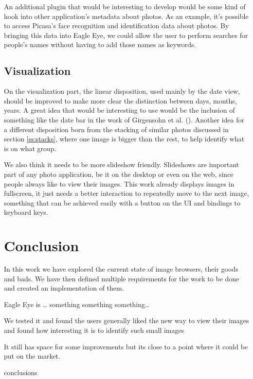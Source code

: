 An additional plugin that would be interesting to develop would be some kind of hook into other application's metadata about photos. As an example, it's possible to access Picasa's face recognition and identification data about photos. By bringing this data into Eagle Eye, we could allow the user to perform searches for people's names without having to add those names as keywords.



\subsection{Visualization} %
\label{sec:visualization}

On the visualization part, the linear disposition, used mainly by the date view, should be improved to make more clear the distinction between days, months, years. A great idea that would be interesting to use would be the inclusion of something like the date bar in the work of Girgensohn et al. \cite{Girgensohn:2010} (). Another idea for a different disposition born from the stacking of similar photos discussed in section \ref{ss:stacks}, where one image is bigger than the rest, to help identify what is on what group.

We also think it needs to be more slideshow friendly. Slideshows are important part of any photo application, be it on the desktop or even on the web, since people always like to view their images. This work already displays images in fullscreen, it just needs a better interaction to repeatedly move to the next image, something that can be achieved easily with a button on the \ac{UI} and bindings to keyboard keys.



\section{Conclusion} %
\label{sec:conclusion}

In this work we have explored the current state of image browsers, their goods and bads. We have then defined multiple requirements for the work to be done and created an implementation of them.

Eagle Eye is … something something something…

We tested it and found the users generally liked the new way to view their images and found how interesting it is to identify such small images

It still has space for some improvements but its close to a point where it could be put on the market. 



conclusions



